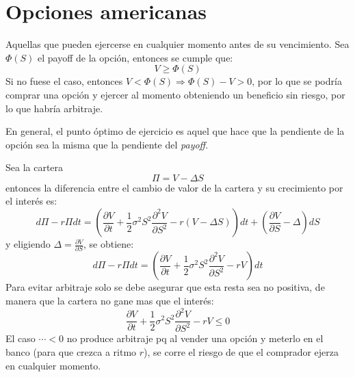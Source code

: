 
\section{Opciones americanas}

Aquellas que pueden ejercerse en cualquier momento antes de su vencimiento. Sea $\Phi(S)$ el payoff de la opción, entonces se cumple que:
\[
\boxed{V \geq \Phi(S)}
\]
Si no fuese el caso, entonces $V < \Phi(S) \Rightarrow \Phi(S) - V > 0$, por lo que se podría comprar una opción y ejercer al momento obteniendo un beneficio sin riesgo, por lo que habría arbitraje.

En general, el punto óptimo de ejercicio es aquel que hace que la pendiente de la opción sea la misma que la pendiente del \textit{payoff}.

Sea la cartera
\[
\Pi = V - \Delta S
\]
entonces la diferencia entre el cambio de valor de la cartera y su crecimiento por el interés es:
\[
d\Pi - r\Pi dt = \left( \frac{\partial V}{\partial t} + \frac{1}{2} \sigma^2 S^2 \frac{\partial^2 V}{\partial S^2} - r(V - \Delta S) \right) dt + \left( \frac{\partial V}{\partial S} - \Delta \right) dS
\]
y eligiendo $\Delta = \frac{\partial V}{\partial S}$, se obtiene:
\[
d\Pi - r\Pi dt = \left( \frac{\partial V}{\partial t} + \frac{1}{2} \sigma^2 S^2 \frac{\partial^2 V}{\partial S^2} - rV \right) dt
\]
Para evitar arbitraje solo se debe asegurar que esta resta sea no positiva, de manera que la cartera no gane mas que el interés:
\[
\boxed{\frac{\partial V}{\partial t} + \frac{1}{2} \sigma^2 S^2 \frac{\partial^2 V}{\partial S^2} - rV \leq 0}
\]
El caso $\cdots < 0$ no produce arbitraje pq al vender una opción y meterlo en el banco (para que crezca a ritmo $r$), se corre el riesgo de que el comprador ejerza en cualquier momento.







